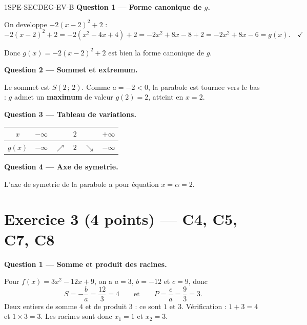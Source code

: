 \begin{corrige}{1SPE-SECDEG-EV-B}
\bigskip
\textbf{Question 1 — Forme canonique de $g$.}


On developpe $-2(x-2)^2 + 2$ :
\[
-2(x-2)^2 + 2 = -2(x^2 - 4x + 4) + 2 = -2x^2 + 8x - 8 + 2 = -2x^2 + 8x - 6 = g(x). \quad \checkmark
\]

Donc $g(x) = -2(x-2)^2 + 2$ est bien la forme canonique de $g$.

\medskip
\textbf{Question 2 — Sommet et extremum.}


Le sommet est $S(2\,;\,2)$. Comme $a = -2 < 0$, la parabole est tournee vers le bas : $g$ admet un \textbf{maximum} de valeur $g(2) = 2$, atteint en $x = 2$.

\medskip
\textbf{Question 3 — Tableau de variations.}

\begin{center}
\begin{tabular}{|c|ccccc|}
\hline
$x$ & $-\infty$ & & $2$ & & $+\infty$ \\
\hline
$g(x)$ & $-\infty$ & $\nearrow$ & $2$ & $\searrow$ & $-\infty$ \\
\hline
\end{tabular}
\end{center}

\medskip
\textbf{Question 4 — Axe de symetrie.}

L'axe de symetrie de la parabole a pour équation $x = \alpha = 2$.

\section*{Exercice 3 \hfill (4 points) — C4, C5, C7, C8}


\bigskip
\textbf{Question 1 — Somme et produit des racines.}


Pour $f(x) = 3x^2 - 12x + 9$, on a $a = 3$, $b = -12$ et $c = 9$, donc
\[
  S = -\frac{b}{a} = \frac{12}{3} = 4
  \qquad\text{et}\qquad
  P = \frac{c}{a} = \frac{9}{3} = 3.
\]
Deux entiers de somme $4$ et de produit $3$ : ce sont $1$ et $3$. Vérification :
$1 + 3 = 4$ et $1 \times 3 = 3$. Les racines sont donc $x_1 = 1$ et $x_2 = 3$.


\end{corrige}
